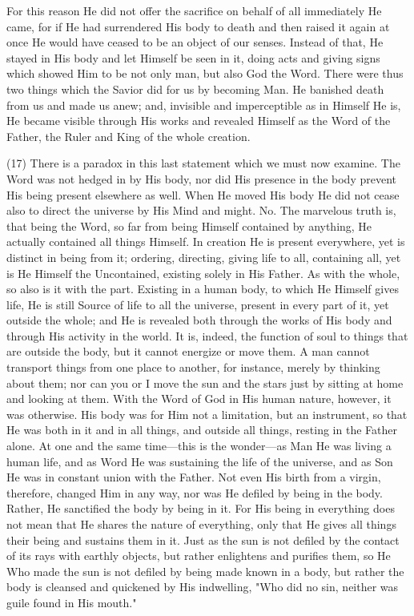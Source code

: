 \documentclass[9pt, twocolumn, oneside, a4paper]{memoir}
\begin{document}
For this reason He did not offer the sacrifice on behalf of all immediately       He came, for if He had surrendered His body to death and then raised it again at       once He would have ceased to be an object of our senses. Instead of that, He       stayed in His body and let Himself be seen in it, doing acts and giving signs       which showed Him to be not only man, but also God the Word. There were thus two       things which the Savior did for us by becoming Man. He banished death from us       and made us anew; and, invisible and imperceptible as in Himself He is, He       became visible through His works and revealed Himself as the Word of the Father,       the Ruler and King of the whole creation.   

\textsc{(17)} There is a paradox in this last statement which we       must now examine. The Word was not hedged in by His body, nor did His presence       in the body prevent His being present elsewhere as well. When He moved His body       He did not cease also to direct the universe by His Mind and might. No. The       marvelous truth is, that being the Word, so far from being Himself contained by       anything, He actually contained all things Himself. In creation He is present       everywhere, yet is distinct in being from it; ordering, directing, giving life       to all, containing all, yet is He Himself the Uncontained, existing solely in       His Father. As with the whole, so also is it with the part. Existing in a human       body, to which He Himself gives life, He is still Source of life to all the       universe, present in every part of it, yet outside the whole; and He is revealed       both through the works of His body and through His activity in the world. It is,       indeed, the function of soul to  things that are outside the body, but it       cannot energize or move them. A man cannot transport things from one place to       another, for instance, merely by thinking about them; nor can you or I move the       sun and the stars just by sitting at home and looking at them. With the Word of       God in His human nature, however, it was otherwise. His body was for Him not a       limitation, but an instrument, so that He was both in it and in all things, and       outside all things, resting in the Father alone. At one and the same time—this       is the wonder—as Man He was living a human life, and as Word He was sustaining       the life of the universe, and as Son He was in constant union with the Father.       Not even His birth from a virgin, therefore, changed Him in any way, nor was He       defiled by being in the body. Rather, He sanctified the body by being in it. For       His being in everything does not mean that He shares the nature of everything,       only that He gives all things their being and sustains them in it. Just as the       sun is not defiled by the contact of its rays with earthly objects, but rather       enlightens and purifies them, so He Who made the sun is not defiled by being       made known in       a body, but rather the body is cleansed and quickened by His       indwelling,       "Who did no sin, neither was guile found in His       mouth."
\end{document}

